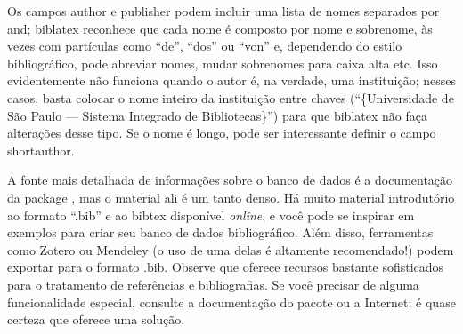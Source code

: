 %
%
%
%

Os campos \textsf{author} e \textsf{publisher} podem incluir uma lista
de nomes separados por \textsf{and}; biblatex reconhece que cada nome é
composto por nome e sobrenome, às vezes com partículas como ``de'', ``dos''
ou ``von'' e, dependendo do estilo bibliográfico, pode abreviar nomes, mudar
sobrenomes para caixa alta etc. Isso evidentemente não funciona quando o autor
é, na verdade, uma instituição; nesses casos, basta colocar o nome inteiro da
instituição entre chaves (``\{Universidade de São Paulo --- Sistema Integrado
de Bibliotecas\}'') para que biblatex não faça alterações desse tipo. Se o
nome é longo, pode ser interessante definir o campo \textsf{shortauthor}.

A fonte mais detalhada de informações sobre o banco de dados é a documentação
da package  \citep[em especial as seções 2.1.1 e 2.2.2]{biblatex},
mas o material ali é um tanto denso.
Há muito material introdutório ao formato ``.bib'' e ao bibtex disponível
\emph{online}, e você pode se inspirar em exemplos para criar seu banco de
dados bibliográfico. Além disso, ferramentas como Zotero ou
Mendeley (o uso de uma delas é altamente recomendado!)
podem exportar para o formato .bib. Observe que 
 oferece recursos bastante sofisticados para o tratamento de
referências e bibliografias. Se você precisar de alguma funcionalidade
especial, consulte a documentação do pacote ou a Internet; é quase certeza
que  oferece uma solução.


